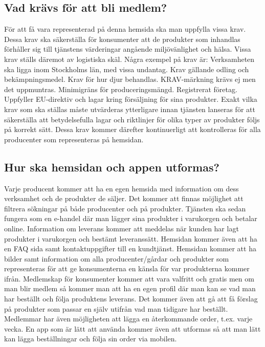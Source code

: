 \documentclass[10pt,a4paper,oneside]{article}
\begin{document}
\subsection{Vad krävs för att bli medlem?}
För att få vara representerad på denna hemsida ska man uppfylla vissa krav. Dessa krav ska säkerställa för konsumenter att de produkter som inhandlas förhåller sig till tjänstens värderingar angående miljövänlighet och hälsa. Vissa krav ställs däremot av logistiska skäl. Några exempel på krav är:  
Verksamheten ska ligga inom Stockholms län, med vissa undantag. 
Krav gällande odling och bekämpningsmedel.
Krav för hur djur behandlas. 
KRAV-märkning krävs ej men det uppmuntras.  
Minimigräns för produceringsmängd. 
Registrerat företag.
Uppfyller EU-direktiv och lagar kring försäljning för sina produkter.
Exakt vilka krav som ska ställas måste utvärderas ytterligare innan tjänsten lanseras för att säkerställa att betydelsefulla lagar och riktlinjer för olika typer av produkter följs på korrekt sätt. Dessa krav kommer därefter kontinuerligt att kontrolleras för alla producenter som representeras på hemsidan. 

\subsection{Hur ska hemsidan och appen utformas?}
Varje producent kommer att ha en egen hemsida med information om dess verksamhet och de produkter de säljer. Det kommer att finnas möjlighet att filtrera sökningar på både producenter och på produkter. Tjänsten ska sedan fungera som en e-handel där man lägger sina produkter i varukorgen och betalar online. Information om leverans kommer att meddelas när kunden har lagt produkter i varukorgen och bestämt leveranssätt. Hemsidan kommer även att ha en FAQ sida samt kontaktuppgifter till en kundtjänst. Hemsidan kommer att ha bilder samt information om alla producenter/gårdar och produkter som representeras för att ge konsumenterna en känsla för var produkterna kommer ifrån. Medlemskap för konsumenter kommer att vara valfritt och gratis men om man blir medlem så kommer man att ha en egen profil där man kan se vad man har beställt och följa produktens leverans. Det kommer även att gå att få förslag på produkter som passar en själv utifrån vad man tidigare har beställt. Medlemmar har även möjligheten att lägga en återkommande order, t.ex. varje vecka. En app som är lätt att använda kommer även att utformas så att man lätt kan lägga beställningar och följa sin order via mobilen.  
\end{document}
